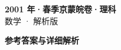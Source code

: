 \documentclass[zihao=-4, a4paper]{ctexart}
\begin{document}
\begin{center}
  {\Large\bfseries 2001 年·春季京蒙皖卷·理科}\\[4pt]
  {\large 数学 · 解析版}
\end{center}
\medskip
{}

\clearpage
{}
\begin{center}{\Large\bfseries 参考答案与详细解析}\end{center}
\medskip

\end{document}
